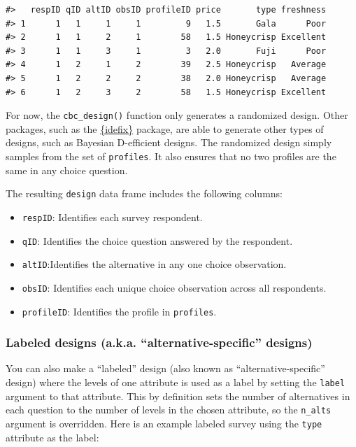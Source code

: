 \documentclass[
  12pt,
]{article}
\providecommand{\tightlist}{%
  \setlength{\itemsep}{0pt}\setlength{\parskip}{0pt}}
\begin{document}
\begin{verbatim}
#>   respID qID altID obsID profileID price       type freshness
#> 1      1   1     1     1         9   1.5       Gala      Poor
#> 2      1   1     2     1        58   1.5 Honeycrisp Excellent
#> 3      1   1     3     1         3   2.0       Fuji      Poor
#> 4      1   2     1     2        39   2.5 Honeycrisp   Average
#> 5      1   2     2     2        38   2.0 Honeycrisp   Average
#> 6      1   2     3     2        58   1.5 Honeycrisp Excellent
\end{verbatim}

For now, the \texttt{cbc\_design()} function only generates a randomized
design. Other packages, such as the
\href{https://github.com/traets/idefix}{\{idefix\}} package, are able to
generate other types of designs, such as Bayesian D-efficient designs.
The randomized design simply samples from the set of \texttt{profiles}.
It also ensures that no two profiles are the same in any choice
question.

The resulting \texttt{design} data frame includes the following columns:

\begin{itemize}
\tightlist
\item
  \texttt{respID}: Identifies each survey respondent.
\item
  \texttt{qID}: Identifies the choice question answered by the
  respondent.
\item
  \texttt{altID}:Identifies the alternative in any one choice
  observation.
\item
  \texttt{obsID}: Identifies each unique choice observation across all
  respondents.
\item
  \texttt{profileID}: Identifies the profile in \texttt{profiles}.
\end{itemize}

\hypertarget{labeled-designs-a.k.a.-alternative-specific-designs}{%
\subsubsection{Labeled designs (a.k.a. ``alternative-specific''
designs)}\label{labeled-designs-a.k.a.-alternative-specific-designs}}

You can also make a ``labeled'' design (also known as
``alternative-specific'' design) where the levels of one attribute is
used as a label by setting the \texttt{label} argument to that
attribute. This by definition sets the number of alternatives in each
question to the number of levels in the chosen attribute, so the
\texttt{n\_alts} argument is overridden. Here is an example labeled
survey using the \texttt{type} attribute as the label:
\end{document}

